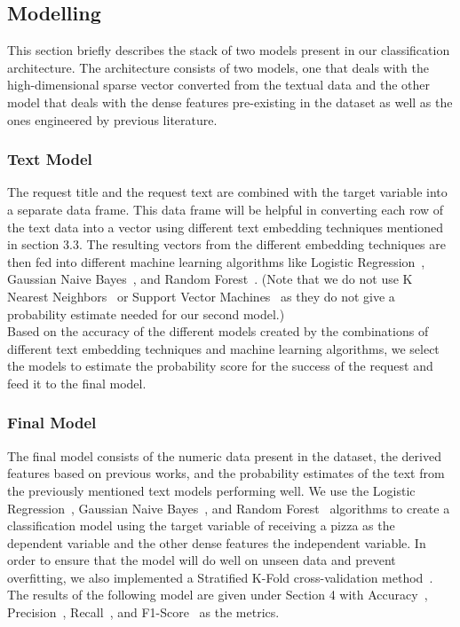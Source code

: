\documentclass[runningheads]{llncs}
\begin{document}
\subsection{Modelling}
This section briefly describes the stack of two models present in our classification architecture. The architecture consists of two models, one that deals with the high-dimensional sparse vector converted from the textual data and the other model that deals with the dense features pre-existing in the dataset as well as the ones engineered by previous literature.
\subsubsection{Text Model}
The request title and the request text are combined with the target variable into a separate data frame. This data frame will be helpful in converting each row of the text data into a vector using different text embedding techniques mentioned in section 3.3. The resulting vectors from the different embedding techniques are then fed into different machine learning algorithms like Logistic Regression~\cite{lr}, Gaussian Naive Bayes~\cite{nb}, and Random Forest~\cite{rf}. (Note that we do not use K Nearest Neighbors~\cite{knn} or Support Vector Machines~\cite{svm} as they do not give a probability estimate needed for our second model.)\\
Based on the accuracy of the different models created by the combinations of different text embedding techniques and machine learning algorithms, we select the models to estimate the probability score for the success of the request and feed it to the final model.
\subsubsection{Final Model}
The final model consists of the numeric data present in the dataset, the derived features based on previous works, and the probability estimates of the text from the previously mentioned text models performing well. We use the Logistic Regression~\cite{lr}, Gaussian Naive Bayes~\cite{nb}, and Random Forest~\cite{rf} algorithms to create a classification model using the target variable of receiving a pizza as the dependent variable and the other dense features the independent variable. In order to ensure that the model will do well on unseen data and prevent overfitting, we also implemented a Stratified K-Fold cross-validation method~\cite{strat_kfold}.\\
The results of the following model are given under Section 4 with Accuracy~\cite{metrics}, Precision~\cite{metrics}, Recall~\cite{metrics}, and F1-Score~\cite{metrics} as the metrics.
\end{document}
